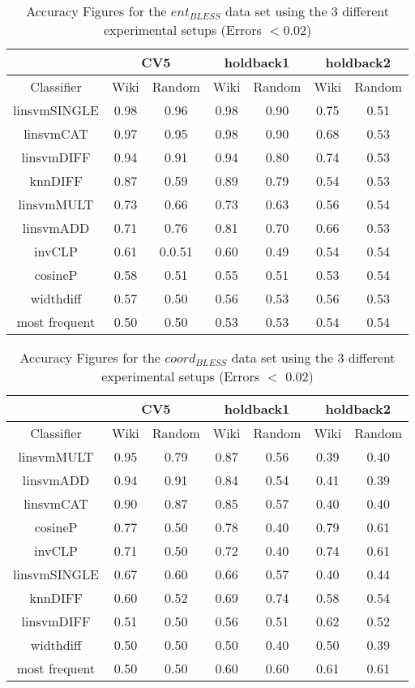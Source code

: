 \documentclass[11pt]{article}
\begin{document}
\begin{table*}[ht]
\centering
\begin{tabular}{|c|c|c|c|c|c|c|}
\hline
&\multicolumn{2}{|c|}{CV5}&\multicolumn{2}{|c|}{holdback1}&\multicolumn{2}{|c|}{holdback2}\\
\hline
Classifier&Wiki&Random&Wiki&Random&Wiki&Random\\
\hline
linsvmSINGLE&0.98&0.96&0.98&0.90&0.75&0.51\\
linsvmCAT&0.97&0.95&0.98&0.90&0.68&0.53\\
linsvmDIFF&0.94&0.91&0.94&0.80&0.74&0.53\\
knnDIFF&0.87&0.59&0.89&0.79&0.54&0.53\\
linsvmMULT&0.73&0.66&0.73&0.63&0.56&0.54\\
linsvmADD&0.71&0.76&0.81&0.70&0.66&0.53\\
invCLP&0.61&0.0.51&0.60&0.49&0.54&0.54\\
cosineP&0.58&0.51&0.55&0.51&0.53&0.54\\
widthdiff&0.57&0.50&0.56&0.53&0.56&0.53\\
most frequent&0.50&0.50&0.53&0.53&0.54&0.54\\
\hline
\end{tabular}
\caption{Accuracy Figures for the \emph{$ent_{BLESS}$} data set using the 3 different experimental setups (Errors $< $0.02)}
\label{table:results_ent_bless}
\end{table*}

\begin{table*}[ht]
\centering
\begin{tabular}{|c|c|c|c|c|c|c|}
\hline
&\multicolumn{2}{|c|}{CV5}&\multicolumn{2}{|c|}{holdback1}&\multicolumn{2}{|c|}{holdback2}\\
\hline
Classifier&Wiki&Random&Wiki&Random&Wiki&Random\\
\hline
linsvmMULT&0.95&0.79&0.87&0.56&0.39&0.40\\
linsvmADD&0.94&0.91&0.84&0.54&0.41&0.39\\
linsvmCAT&0.90&0.87&0.85&0.57&0.40&0.40\\
cosineP&0.77&0.50&0.78&0.40&0.79&0.61\\
invCLP&0.71&0.50&0.72&0.40&0.74&0.61\\
linsvmSINGLE&0.67&0.60&0.66&0.57&0.40&0.44\\
knnDIFF&0.60&0.52&0.69&0.74&0.58&0.54\\
linsvmDIFF&0.51&0.50&0.56&0.51&0.62&0.52\\
widthdiff&0.50&0.50&0.50&0.40&0.50&0.39\\
most frequent&0.50&0.50&0.60&0.60&0.61&0.61\\
\hline
\end{tabular}
\caption{Accuracy Figures for the \emph{$coord_{BLESS}$} data set using the 3 different experimental setups (Errors $<$ 0.02)}
\label{table:results_coord_bless}
\end{table*}
\end{document}
